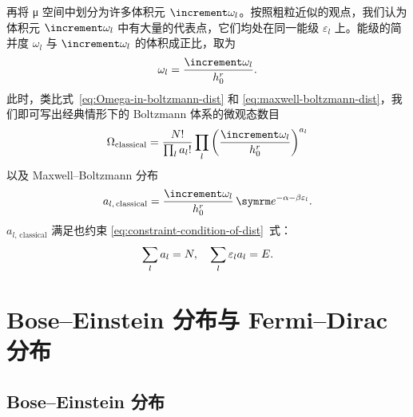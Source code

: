 再将 μ 空间中划分为许多体积元 $\incr{\omega_l}$。按照粗粒近似的观点，我们认为体积元
$\incr{\omega_l}$ 中有大量的代表点，它们均处在同一能级 $\varepsilon_l$ 上。能级的简并度 $\omega_l$
与 $\incr{\omega_l}$ 的体积成正比，取为
\begin{equation} \label{eq:degeneracy-classical}
  \omega_l = \frac{\incr{\omega_l}}{h_0^r}.
\end{equation}
此时，类比式~\eqref{eq:Omega-in-boltzmann-dist} 和 \eqref{eq:maxwell-boltzmann-dist}，我
们即可写出经典情形下的 Boltzmann 体系的微观态数目
\begin{equation}
  \Omega_\text{classical}
  = \frac{N!}{\prod_l a_l!} \prod_l \qty(\frac{\incr{\omega_l}}{h_0^r})^{a_l}
\end{equation}
以及 Maxwell--Boltzmann 分布
\begin{equation}
  a_{l,\,\text{classical}} = \frac{\incr{\omega_l}}{h_0^r} \, \ee^{-\alpha-\beta\varepsilon_l}.
\end{equation}
$a_{l,\,\text{classical}}$ 满足也约束 \eqref{eq:constraint-condition-of-dist}~式：
\begin{equation}
  \sum_l a_l = N \qc \sum_l \varepsilon_l a_l = E.
\end{equation}

\section{Bose--Einstein 分布与 Fermi--Dirac 分布}

\subsection{Bose--Einstein 分布}

